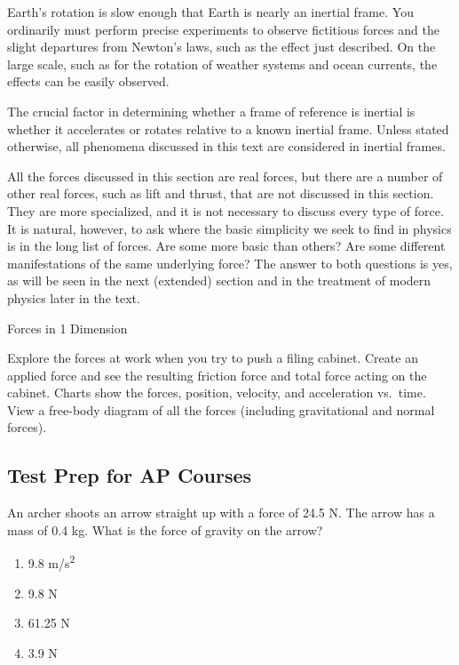 \documentclass[
]{book}
\providecommand{\tightlist}{%
  \setlength{\itemsep}{0pt}\setlength{\parskip}{0pt}}
\begin{document}
Earth's rotation is slow enough that Earth is nearly an inertial frame.
You ordinarily must perform precise experiments to observe fictitious
forces and the slight departures from Newton's laws, such as the effect
just described. On the large scale, such as for the rotation of weather
systems and ocean currents, the effects can be easily observed.

The crucial factor in determining whether a frame of reference is
inertial is whether it accelerates or rotates relative to a known
inertial frame. Unless stated otherwise, all phenomena discussed in this
text are considered in inertial frames.

All the forces discussed in this section are real forces, but there are
a number of other real forces, such as lift and thrust, that are not
discussed in this section. They are more specialized, and it is not
necessary to discuss every type of force. It is natural, however, to ask
where the basic simplicity we seek to find in physics is in the long
list of forces. Are some more basic than others? Are some different
manifestations of the same underlying force? The answer to both
questions is yes, as will be seen in the next (extended) section and in
the treatment of modern physics later in the text.

\hypertarget{eip-456}{}
Forces in 1 Dimension

Explore the forces at work when you try to push a filing cabinet. Create
an applied force and see the resulting friction force and total force
acting on the cabinet. Charts show the forces, position, velocity, and
acceleration vs.~time. View a free-body diagram of all the forces
(including gravitational and normal forces).

\hypertarget{forces_in_1_direction}{}

\hypertarget{fs-id1625453}{}
\hypertarget{test-prep-for-ap-courses-11}{%
\subsection{Test Prep for AP Courses}\label{test-prep-for-ap-courses-11}}

\hypertarget{fs-id1367314}{}
\leavevmode{}%
An archer shoots an arrow straight up with a force of 24.5 N. The arrow
has a mass of 0.4 kg. What is the force of gravity on the arrow?

\begin{enumerate}
\def\labelenumi{\alph{enumi}.}
\tightlist
\item
  9.8 m/s\textsuperscript{2}
\item
  9.8 N
\item
  61.25 N
\item
  3.9 N
\end{enumerate}
\end{document}
